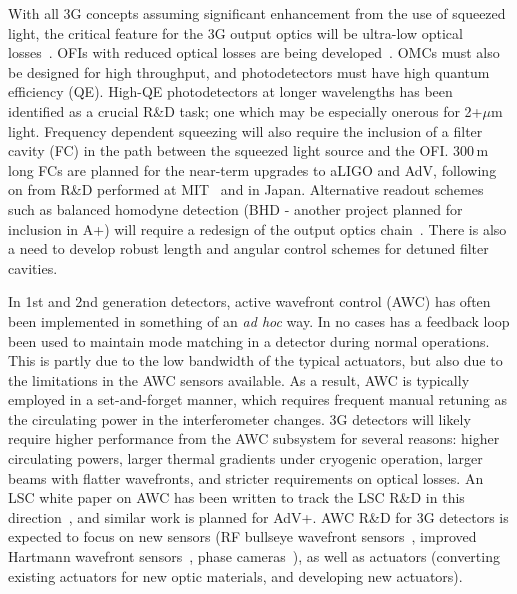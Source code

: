 With all 3G concepts assuming significant enhancement from the use of squeezed light, the critical feature for the 3G output optics will be ultra-low optical losses~\cite{squeeze_lossbudget}. OFIs with reduced optical losses are being developed~\cite{EGOLLFI,UFLLFI}.
OMCs must also be designed for high throughput, and photodetectors must have high quantum efficiency (QE). High-QE photodetectors at longer wavelengths has been identified as a crucial R\&D task; one which may be especially onerous for 2+$\mu$m light. Frequency dependent squeezing will also require the inclusion of a filter cavity (FC) in the path between the squeezed light source and the OFI. 300\,m long FCs are planned for the near-term upgrades to aLIGO and AdV, following on from R\&D performed at MIT~\cite{MITFC} and in Japan\cite{TAMA_FDS2016}. Alternative readout schemes such as balanced homodyne detection (BHD - another project planned for inclusion in A+) will require a redesign of the output optics chain~\cite{BHD}. There is also a need to develop robust length and angular control schemes for detuned filter cavities.

In 1st and 2nd generation detectors, active wavefront control (AWC) has often been implemented in something of an \emph{ad hoc} way. In no cases has a feedback loop been used to maintain mode matching in a detector during normal operations. This is partly due to the low bandwidth of the typical actuators, but also due to the limitations in the AWC sensors available. As a result, AWC is typically employed in a set-and-forget manner, which requires frequent manual retuning as the circulating power in the interferometer changes. 3G detectors will likely require higher performance from the AWC subsystem for several reasons: higher circulating powers, larger thermal gradients under cryogenic operation, larger beams with flatter wavefronts, and stricter requirements on optical losses. An LSC white paper on AWC has been written to track the LSC R\&D in this direction~\cite{aLIGO_AWC}, and similar work is planned for AdV+. AWC R\&D for 3G detectors is expected to focus on new sensors (RF bullseye wavefront sensors~\cite{bullseye}, improved Hartmann wavefront sensors~\cite{HWS}, phase cameras~\cite{phasecam}), as well as actuators (converting existing actuators for new optic materials, and developing new actuators). 

